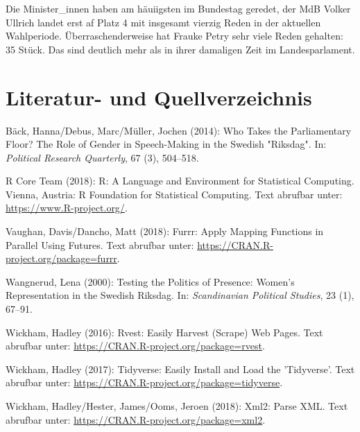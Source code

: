 \documentclass[oneside, 12pt]{scrbook}
\theoremstyle{definition}
\theoremstyle{definition}
\theoremstyle{definition}
\theoremstyle{remark}
\begin{document}
Die Minister\_innen haben am häuiigsten im Bundestag geredet, der MdB
Volker Ullrich landet erst af Platz 4 mit insgesamt vierzig Reden in der
aktuellen Wahlperiode. Überraschenderweise hat Frauke Petry sehr viele
Reden gehalten: 35 Stück. Das sind deutlich mehr als in ihrer damaligen
Zeit im Landesparlament.

\hypertarget{literatur--und-quellverzeichnis}{%
\chapter*{Literatur- und
Quellverzeichnis}\label{literatur--und-quellverzeichnis}}

\hypertarget{refs}{}
\leavevmode\hypertarget{ref-back_2014}{}%
Bäck, Hanna/Debus, Marc/Müller, Jochen (2014): Who Takes the
Parliamentary Floor? The Role of Gender in Speech-Making in the Swedish
"Riksdag". In: \emph{Political Research Quarterly}, 67 (3), 504--518.

\leavevmode\hypertarget{ref-rcoreteam_2018}{}%
R Core Team (2018): R: A Language and Environment for Statistical
Computing. Vienna, Austria: R Foundation for Statistical Computing. Text
abrufbar unter: \url{https://www.R-project.org/}.

\leavevmode\hypertarget{ref-vaughan_2018}{}%
Vaughan, Davis/Dancho, Matt (2018): Furrr: Apply Mapping Functions in
Parallel Using Futures. Text abrufbar unter:
\url{https://CRAN.R-project.org/package=furrr}.

\leavevmode\hypertarget{ref-wangnerud_2000}{}%
Wangnerud, Lena (2000): Testing the Politics of Presence: Women's
Representation in the Swedish Riksdag. In: \emph{Scandinavian Political
Studies}, 23 (1), 67--91.

\leavevmode\hypertarget{ref-wickham_2016}{}%
Wickham, Hadley (2016): Rvest: Easily Harvest (Scrape) Web Pages. Text
abrufbar unter: \url{https://CRAN.R-project.org/package=rvest}.

\leavevmode\hypertarget{ref-wickham_2017}{}%
Wickham, Hadley (2017): Tidyverse: Easily Install and Load the
'Tidyverse'. Text abrufbar unter:
\url{https://CRAN.R-project.org/package=tidyverse}.

\leavevmode\hypertarget{ref-wickham_2018}{}%
Wickham, Hadley/Hester, James/Ooms, Jeroen (2018): Xml2: Parse XML. Text
abrufbar unter: \url{https://CRAN.R-project.org/package=xml2}.
\end{document}
